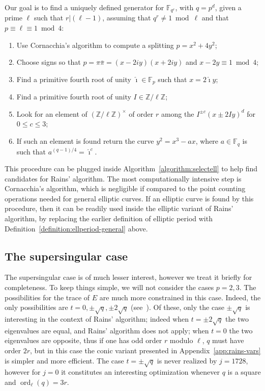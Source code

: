 \documentclass[12pt]{article}
\theoremstyle{plain}
\theoremstyle{definition}
\DeclareMathOperator{\order}{ord} %
\def\Z{\ensuremath{\mathbb{Z}}}
\def\F{\ensuremath{\mathbb{F}}}
\newcounter{algorithm}
\begin{document}
Our goal is to find a uniquely defined generator for $\F_{q^r}$, with
$q=p^d$, given a prime $\ell$ such that $r|(\ell-1)$, assuming that
$q^r\ne 1\bmod\ell$ and that $p\equiv\ell\equiv 1 \bmod 4$:
\begin{enumerate}
\item Use Cornacchia's algorithm to compute a splitting $p=x^2+4y^2$;
\item Choose signs so that $p=\pi\bar\pi=(x-2iy)(x+2iy)$ and
  $x - 2y \equiv 1 \bmod 4$;
\item Find a primitive fourth root of unity $\hat\imath\in\F_p$ such that
  $x=2\hat\imath y$;
\item Find a primitive fourth root of unity $I\in\Z/\ell\Z$;
\item Look for an element of $(\Z/\ell\Z)^\times$ of order $r$ among
  the $I^{\pm c}(x\pm2Iy)^d$ for $0\le c \le 3$;
\item If such an element is found return the curve $y^2=x^3-ax$, where
  $a\in\F_q$ is such that $a^{(q-1)/4}=\hat\imath^c$.
\end{enumerate}

This procedure can be plugged inside
Algorithm~\ref{algorithm:selectell} to help find candidates for Rains'
algorithm. %
The most computationally intensive step is Cornacchia's algorithm,
which is negligible if compared to the point counting operations
needed for general elliptic curves. %
If an elliptic curve is found by this procedure, then it can be
readily used inside the elliptic variant of Rains' algorithm, by
replacing the earlier definition of elliptic period with
Definition~\ref{definition:ellperiod-general} above.


\subsection{The supersingular case}

The supersingular case is of much lesser interest, however we treat it
briefly for completeness. %
To keep things simple, we will not consider the cases $p=2,3$. %
The possibilities for the trace of $E$ are much more constrained in
this case. %
Indeed, the only possibilities are $t=0,\pm\sqrt{q},\pm2\sqrt{q}$
(see~\cite{waterhouse69}). %
Of these, only the case $\pm\sqrt{q}$ is interesting in the context of
Rains' algorithm; indeed when $t=\pm2\sqrt{q}$ the two eigenvalues are
equal, and Rains' algorithm does not apply; when $t=0$ the two
eigenvalues are opposite, thus if one has odd order $r$ modulo $\ell$,
$q$ must have order $2r$, but in this case the conic variant presented
in Appendix~\ref{app:rains-vars} is simpler and more efficient. %
The case $t=\pm\sqrt{q}$ is never realized by $j=1728$, however for
$j=0$ it constitutes an interesting optimization whenever $q$ is a
square and $\order_\ell(q)=3r$. %
\end{document}
